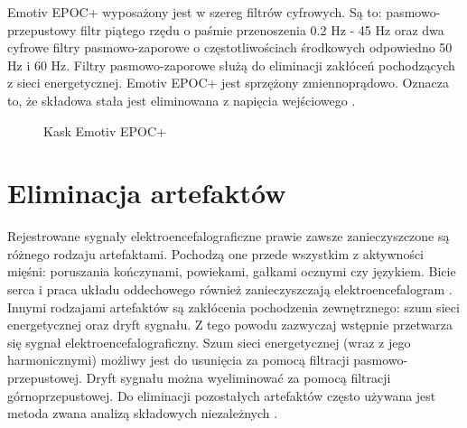 \documentclass[notitlepage]{report}
\begin{document}
Emotiv EPOC+ wyposażony jest w szereg filtrów cyfrowych. Są to: pasmowo-przepustowy filtr piątego rzędu o paśmie przenoszenia 0.2 Hz - 45 Hz oraz dwa cyfrowe filtry pasmowo-zaporowe o częstotliwościach środkowych odpowiedno 50 Hz i 60 Hz. Filtry pasmowo-zaporowe służą do eliminacji zakłóceń pochodzących z sieci energetycznej. Emotiv EPOC+ jest sprzężony zmiennoprądowo. Oznacza to, że składowa stała jest eliminowana z napięcia wejściowego \cite{emotiv} \cite{emotiv2}.
\begin{figure}[H]
	\centering
	\caption{Kask Emotiv EPOC+ \cite{emotiv}}
\end{figure}

\chapter{Eliminacja artefaktów}
Rejestrowane sygnały elektroencefalograficzne prawie zawsze zanieczyszczone są różnego rodzaju artefaktami. Pochodzą one przede wszystkim z aktywności mięśni: poruszania kończynami, powiekami, gałkami ocznymi czy językiem. Bicie serca i praca układu oddechowego również zanieczyszczają elektroencefalogram \cite{uriguen}. Innymi rodzajami artefaktów są zakłócenia pochodzenia zewnętrznego: szum sieci energetycznej oraz dryft sygnału. Z tego powodu zazwyczaj wstępnie przetwarza się sygnał elektroencefalograficzny. Szum sieci energetycznej (wraz z jego harmonicznymi) możliwy jest do usunięcia za pomocą filtracji pasmowo-przepustowej. Dryft sygnału można wyeliminować za pomocą filtracji górnoprzepustowej. Do eliminacji pozostałych artefaktów często używana jest metoda zwana analizą składowych niezależnych \cite{uriguen}. 
\end{document}
